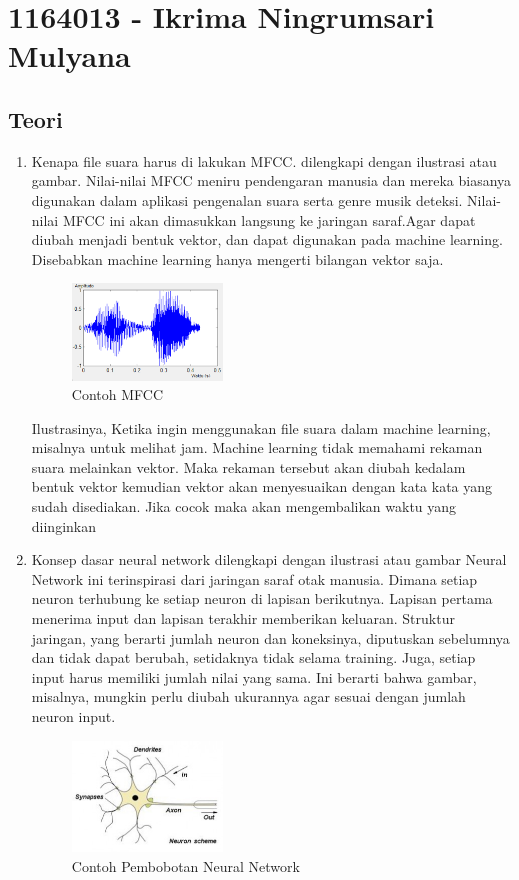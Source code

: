 \section{1164013 - Ikrima Ningrumsari Mulyana}
\subsection{Teori}
\begin{enumerate}
	\item Kenapa file suara harus di lakukan MFCC. dilengkapi dengan ilustrasi atau gambar.
	\hfill\break
	Nilai-nilai MFCC meniru pendengaran manusia dan mereka biasanya digunakan dalam aplikasi pengenalan suara serta genre musik deteksi. Nilai-nilai MFCC ini akan dimasukkan langsung ke jaringan saraf.Agar dapat diubah menjadi bentuk vektor, dan dapat digunakan pada machine learning. Disebabkan machine learning hanya mengerti bilangan vektor saja.
	\begin{figure}[H]
		\includegraphics[width=4cm]{figures/1164013/6/7.png}
		\centering
		\caption{Contoh MFCC}
	\end{figure}
	Ilustrasinya, Ketika ingin menggunakan file suara dalam machine learning, misalnya untuk melihat jam. Machine learning tidak memahami rekaman suara melainkan vektor. Maka rekaman tersebut akan diubah kedalam bentuk vektor kemudian vektor akan menyesuaikan dengan kata kata yang sudah disediakan. Jika cocok maka akan mengembalikan waktu yang diinginkan
	
	\item Konsep dasar neural network dilengkapi dengan ilustrasi atau gambar
	\hfill\break
	Neural Network ini terinspirasi dari jaringan saraf otak manusia. Dimana setiap neuron terhubung ke setiap neuron di lapisan berikutnya. Lapisan pertama menerima input dan lapisan terakhir memberikan keluaran. Struktur jaringan, yang berarti jumlah neuron dan koneksinya, diputuskan sebelumnya dan tidak dapat berubah, setidaknya tidak selama training. Juga, setiap input harus memiliki jumlah nilai yang sama. Ini berarti bahwa gambar, misalnya, mungkin perlu diubah ukurannya agar sesuai dengan jumlah neuron input.
	\begin{figure}[H]
		\includegraphics[width=4cm]{figures/1164013/6/8.jpg}
		\centering
		\caption{Contoh Pembobotan Neural Network}
	\end{figure}


\end{enumerate}
